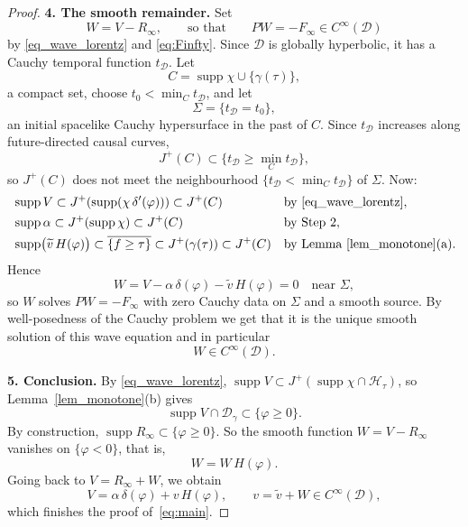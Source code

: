 \documentclass[12pt,reqno]{amsart}
\numberwithin{equation}{section}
\theoremstyle{definition}
\theoremstyle{plain}
\theoremstyle{definition}
\theoremstyle{definition}
\newcommand{\D}{\mathcal{D}}
\newcommand{\Ht}{\mathcal{H}_{\tau}}
\newcommand{\dg}{\D_\gamma}
\DeclareMathOperator{\supp}{supp}
\begin{document}
\begin{proof}
\medskip\noindent
\textbf{4. The smooth remainder.}
Set
\begin{equation}
  W=V-R_\infty,
  \qquad\text{so that}\qquad
  PW=-F_\infty\in C^\infty(\D)
  \label{eq:W}
\end{equation}
by \eqref{eq_wave_lorentz} and \eqref{eq:Finfty}. Since $\D$ is globally hyperbolic, it has a Cauchy temporal function $t_{\D}$. Let
\begin{equation*}
C=\supp\chi\cup\{\gamma(\tau)\},
\end{equation*}
a compact set, choose $t_0<\min_Ct_{\D}$, and let
\begin{equation*}
\Sigma=\{t_{\D}=t_0\},
\end{equation*}
an initial spacelike Cauchy hypersurface in the past of $C$. Since $t_{\D}$ increases along future-directed causal curves,
\begin{equation*}
J^+(C)\subset\{t_{\D}\ge\min_Ct_{\D}\},
\end{equation*}
so $J^+(C)$ does not meet the neighbourhood $\{t_{\D}<\min_Ct_{\D}\}$ of $\Sigma$. Now:
\begin{equation*}
\begin{aligned}
&\supp V\subset J^+(\supp(\chi\,\delta'(\varphi)))\subset J^+(C)&&\text{by \eqref{eq_wave_lorentz}},\\
&\supp\alpha\subset J^+(\supp\chi)\subset J^+(C)&&\text{by Step~2},\\
&\supp\bigl(\widetilde v\,H(\varphi)\bigr)\subset\overline{\{f\ge\tau\}}\subset J^+(\gamma(\tau))\subset J^+(C)&&\text{by Lemma~\ref{lem_monotone}(a)}.
\end{aligned}
\end{equation*}
Hence
\begin{equation*}
W=V-\alpha\,\delta(\varphi)-\widetilde v\,H(\varphi)=0\quad\text{near }\Sigma,
\end{equation*}
so $W$ solves $PW=-F_\infty$ with zero Cauchy data on $\Sigma$ and a smooth source. By well-posedness of the Cauchy problem we get that it is the unique smooth solution of this wave equation and in particular
\begin{equation}
  W\in C^\infty(\D).
  \label{eq:W-smooth}
\end{equation}

\medskip\noindent
\textbf{5. Conclusion.}
By \eqref{eq_wave_lorentz}, $\supp V\subset J^+(\supp\chi\cap\Ht)$, so Lemma~\ref{lem_monotone}(b) gives
\begin{equation*}
\supp V\cap\dg\subset\{\varphi\ge0\}.
\end{equation*}
By construction, $\supp R_\infty\subset\{\varphi\ge0\}$. So the smooth function $W=V-R_\infty$ vanishes on $\{\varphi<0\}$, that is,
\begin{equation*}
W=W\,H(\varphi).
\end{equation*}
Going back to $V=R_\infty+W$, we obtain
\begin{equation*}
V=\alpha\,\delta(\varphi)+v\,H(\varphi),\qquad v=\widetilde v+W\in C^\infty(\D),
\end{equation*}
which finishes the proof of~\eqref{eq:main}.
\end{proof}
\end{document}
